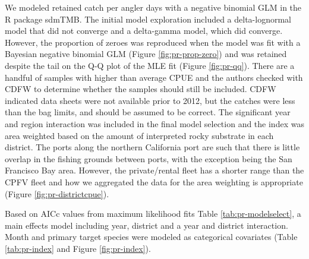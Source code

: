 \documentclass[11pt,
  english,
  letterpaper,
]{article}
\begin{document}
We modeled retained catch per angler days with a negative binomial GLM in the R package sdmTMB. The initial model exploration included a delta-lognormal model that did not converge and a delta-gamma model, which did converge. However, the proportion of zeroes was reproduced when the model was fit with a Bayesian negative binomial GLM (Figure \ref{fig:pr-prop-zero}) and was retained despite the tail on the Q-Q plot of the MLE fit (Figure \ref{fig:pr-qq}). There are a handful of samples with higher than average CPUE and the authors checked with CDFW to determine whether the samples should still be included. CDFW indicated data sheets were not available prior to 2012, but the catches were less than the bag limits, and should be assumed to be correct. The significant year and region interaction was included in the final model selection and the index was area weighted based on the amount of interpreted rocky substrate in each district. The ports along the northern California port are such that there is little overlap in the fishing grounds between ports, with the exception being the San Francisco Bay area. However, the private/rental fleet has a shorter range than the CPFV fleet and how we aggregated the data for the area weighting is appropriate (Figure \ref{fig:pr-districtcpue}).

Based on AICc values from maximum likelihood fits Table \ref{tab:pr-modelselect}, a main effects model including year, district and a year and district interaction. Month and primary target species were modeled as categorical covariates (Table \ref{tab:pr-index} and Figure \ref{fig:pr-index}).

\newpage

\begingroup\fontsize{10}{12}\selectfont
\begingroup\fontsize{10}{12}\selectfont
\end{document}
